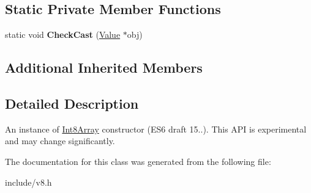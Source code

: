 \subsection*{Static Private Member Functions}
\begin{DoxyCompactItemize}
\item 
static void {\bfseries Check\+Cast} (\hyperlink{classv8_1_1_value}{Value} $\ast$obj)\hypertarget{classv8_1_1_int8_array_af584378c18f21b30fab6820ca0bd3c60}{}\label{classv8_1_1_int8_array_af584378c18f21b30fab6820ca0bd3c60}

\end{DoxyCompactItemize}
\subsection*{Additional Inherited Members}


\subsection{Detailed Description}
An instance of \hyperlink{classv8_1_1_int8_array}{Int8\+Array} constructor (E\+S6 draft 15..). This A\+PI is experimental and may change significantly. 

The documentation for this class was generated from the following file\+:\begin{DoxyCompactItemize}
\item 
include/v8.\+h\end{DoxyCompactItemize}
